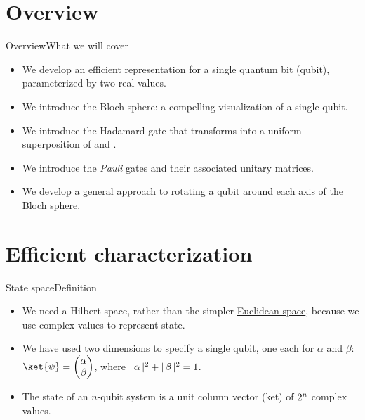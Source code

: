 
\section{Overview}
\begin{frame}{Overview}{What we will cover}
\begin{itemize}
    \item We develop an efficient representation for a single quantum bit (qubit), parameterized by two real values.
    \item We introduce the Bloch sphere: a compelling visualization of a single qubit.
    \item We introduce the Hadamard gate that transforms  into a uniform superposition of  and .
    \item We introduce the \emph{Pauli} gates and their associated unitary matrices.
    \item We develop a general approach to rotating a qubit around each axis of the Bloch sphere.
\end{itemize}
\end{frame}

\section{Efficient characterization}

\begin{frame}{State space}{Definition}
\begin{itemize}
    \item We need a Hilbert space, rather than the simpler \href{https://en.wikipedia.org/wiki/Euclidean_space}{Euclidean space}, because we use complex values to represent state.
    \item We have used two dimensions to specify a single qubit, one each for $\alpha$ and $\beta$: $\ket{\psi}=\SQB{\alpha}{\beta}$, where
    $|\,\alpha\,|^{2}+|\,\beta\,|^{2}=1$.
  
    \item The state of an $n$-qubit system is a unit column vector (ket)  of $2^{n}$ complex values.
\end{itemize}
\end{frame}


